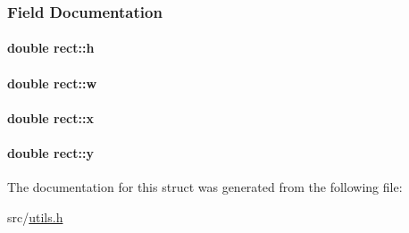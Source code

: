 \subsubsection{\-Field \-Documentation}
\hypertarget{structrect_ad9b40821e105de13114d67d67ea12922}{
\paragraph[{h}]{\setlength{\rightskip}{0pt plus 5cm}double {\bf rect\-::h}}}\label{structrect_ad9b40821e105de13114d67d67ea12922}
\hypertarget{structrect_a1afcd50e56c883442733a453b43c317a}{
\paragraph[{w}]{\setlength{\rightskip}{0pt plus 5cm}double {\bf rect\-::w}}}\label{structrect_a1afcd50e56c883442733a453b43c317a}
\hypertarget{structrect_ac952440ed96ec3bd9debf8785a0c14d1}{
\paragraph[{x}]{\setlength{\rightskip}{0pt plus 5cm}double {\bf rect\-::x}}}\label{structrect_ac952440ed96ec3bd9debf8785a0c14d1}
\hypertarget{structrect_aed33fdc13b11486c1853cd473cd6505f}{
\paragraph[{y}]{\setlength{\rightskip}{0pt plus 5cm}double {\bf rect\-::y}}}\label{structrect_aed33fdc13b11486c1853cd473cd6505f}


\-The documentation for this struct was generated from the following file\-:\begin{DoxyCompactItemize}
\item 
src/\hyperlink{utils_8h}{utils.\-h}\end{DoxyCompactItemize}
